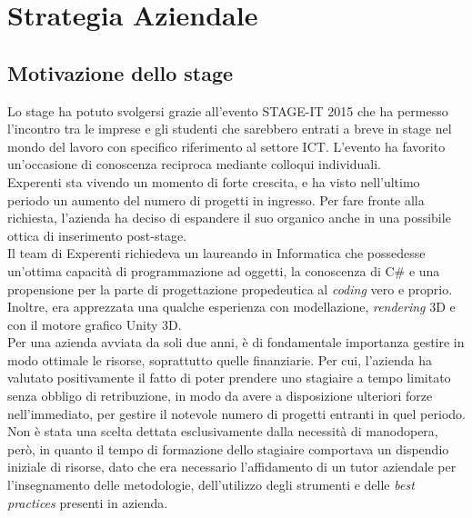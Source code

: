 \section{Strategia Aziendale}
\subsection{Motivazione dello stage}
Lo stage ha potuto svolgersi grazie all'evento STAGE-IT 2015 che ha permesso l'incontro tra le imprese e gli studenti che sarebbero entrati a breve in stage nel mondo del lavoro con specifico riferimento al settore ICT. L'evento ha favorito un'occasione di conoscenza reciproca mediante colloqui individuali.
\\
Experenti sta vivendo un momento di forte crescita, e ha visto nell'ultimo periodo un aumento del numero di progetti in ingresso. Per fare fronte alla richiesta, l'azienda ha deciso di espandere il suo organico anche in una possibile ottica di inserimento post-stage.
\\
Il team di Experenti richiedeva un laureando in Informatica che possedesse un’ottima capacità di programmazione ad oggetti, la conoscenza di C\# e una propensione per la parte di progettazione propedeutica al \textit{coding} vero e proprio.
Inoltre, era apprezzata una qualche esperienza con modellazione, \textit{rendering} 3D e con il motore grafico Unity 3D.
\\
Per una azienda avviata da soli due anni, \`e di fondamentale importanza gestire in modo ottimale le risorse, soprattutto quelle finanziarie. Per cui, l'azienda ha valutato positivamente il fatto di poter prendere uno stagiaire a tempo limitato senza obbligo di retribuzione, in modo da avere a disposizione ulteriori forze nell'immediato, per gestire il notevole numero di progetti entranti in quel periodo. 
\\
Non \`e stata una scelta dettata esclusivamente dalla necessit\`a di manodopera, per\`o, in quanto il tempo di formazione dello stagiaire comportava un dispendio iniziale di risorse, dato che era necessario l'affidamento di un tutor aziendale per l'insegnamento delle metodologie, dell'utilizzo degli strumenti e delle \textit{best practices} presenti in azienda.
